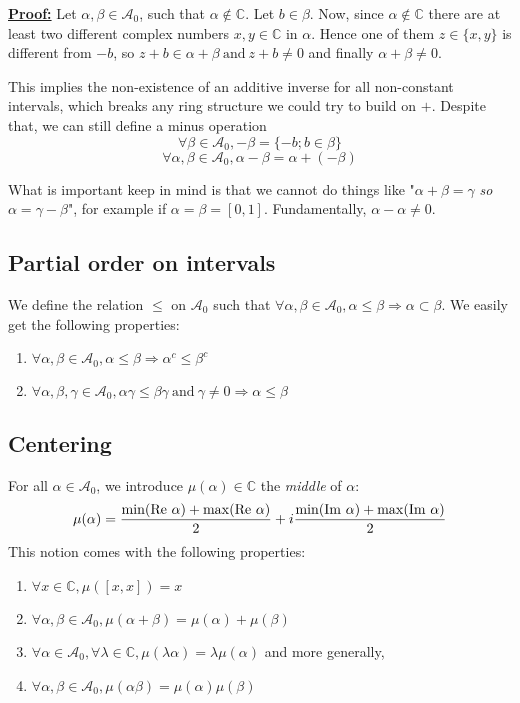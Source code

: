 \noindent \underline{\textbf{Proof:}} Let $\alpha, \beta \in \mathcal{A}_0$, such that $\alpha \not\in \mathbb{C}$. Let $b \in \beta$.
Now, since $\alpha \not\in \mathbb{C}$ there are at least two different complex numbers $x, y \in \mathbb{C}$ in $\alpha$. Hence one of them $z \in \{x, y\}$ is different from $-b$, so $z + b \in \alpha + \beta ~\text{and}~ z + b \not=0$ and finally $\alpha + \beta \not= 0$.
\hfill{} $\boxed{}$

\vspace{1em}
This implies the non-existence of an additive inverse for all non-constant intervals, which breaks any ring structure we could try to build on $+$. Despite that, we can still define a minus operation
$$\forall \beta \in \mathcal{A}_0, -\beta = \{-b ; b \in \beta\}$$
$$\forall \alpha, \beta \in \mathcal{A}_0, \alpha - \beta = \alpha + (- \beta)$$

What is important keep in mind is that we cannot do things like "$\alpha + \beta = \gamma$ \textit{so} $\alpha = \gamma - \beta$", for example if $\alpha = \beta = [0, 1]$. Fundamentally, $\alpha - \alpha \not= 0$.

\subsection{Partial order on intervals}

We define the relation $\le$ on $\mathcal{A}_0$ such that $\forall \alpha, \beta \in \mathcal{A}_0, \alpha \le \beta \Rightarrow \alpha \subset \beta$.
We easily get the following properties:
\begin{enumerate}[i]
    \item $\forall \alpha, \beta \in \mathcal{A}_0, \alpha \le \beta \Rightarrow \alpha^c \le \beta^c$
    \item $\forall \alpha, \beta, \gamma \in \mathcal{A}_0, \alpha \gamma \le \beta \gamma ~\text{and}~ \gamma \not=0 \Rightarrow \alpha \le \beta$
\end{enumerate}

\subsection{Centering}

For all $\alpha \in \mathcal{A}_0$, we introduce $\mu(\alpha) \in \mathbb{C}$ the \textit{middle} of $\alpha$:
$$\mu(\alpha) = \frac{\min(\mathrm{Re}~\alpha) + \max(\mathrm{Re}~\alpha)}{2} + i \frac{\min(\mathrm{Im}~\alpha) + \max(\mathrm{Im}~\alpha)}{2}$$
This notion comes with the following properties:
\begin{enumerate}[i]
    \item $\forall x \in \mathbb{C}, \mu([x, x]) = x$
    \item\label{musum} $\forall \alpha, \beta \in \mathcal{A}_0, \mu(\alpha + \beta) = \mu(\alpha) + \mu(\beta)$
    \item \label{muscalarprod}$\forall \alpha \in \mathcal{A}_0, \forall \lambda \in \mathbb{C}, \mu(\lambda \alpha) = \lambda \mu(\alpha)$ and more generally,
    \item $\forall \alpha, \beta \in \mathcal{A}_0, \mu(\alpha \beta) = \mu(\alpha) \mu(\beta)$
\end{enumerate}

